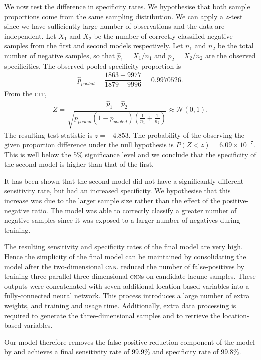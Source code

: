 We now test the difference in specificity rates. We hypothesise that both sample proportions come from the same sampling distribution. We can apply a $z$-test since we have sufficiently large number of observations and the data are independent. Let $X_1$ and $X_2$ be the number of correctly classified negative samples from the first and second models respectively. Let $n_1$ and $n_2$ be the total number of negative samples, so that $\hat{p}_1 = {X_1}/{n_1}$ and $\hat{p}_2 = {X_2}/{n_2}$ are the observed specificities. The observed pooled specificity proportion is
\begin{align*}
	\hat p_{pooled} = \dfrac{1863+9977}{1879+9996} = 0.9970526.
\end{align*}
From the \textsc{clt},
\begin{align*}
	Z = \dfrac{\hat{p}_1 - \hat{p}_2}{\sqrt{p_{pooled}(1 - p_{pooled})\left(\frac{1}{n_1} + \frac{1}{n_2}\right)}} \approx \mathcal{N}(0,1).
\end{align*}
The resulting test statistic is $z = -4.853$. The probability of the observing the given proportion difference under the null hypothesis is $P(Z < z) = 6.09\times10^{-7}$. This is well below the 5\% significance level and we conclude that the specificity of the second model is higher than that of the first.

It has been shown that the second model did not have a significantly different sensitivity rate, but had an increased specificity. We hypothesise that this increase was due to the larger sample size rather than the effect of the positive-negative ratio. The model was able to correctly classify a greater number of negative samples since it was exposed to a larger number of negatives during training.

The resulting sensitivity and specificity rates of the final model are very high. Hence the simplicity of the final model can be maintained by consolidating the model after the two-dimensional \textsc{cnn}. \cite{GhafoorianM.2017Dml3} reduced the number of false-positives by training three parallel three-dimensional \textsc{cnn}s on candidate lacune samples. These outputs were concatenated with seven additional location-based variables into a fully-connected neural network. This process introduces a large number of extra weights, and training and usage time. Additionally, extra data processing is required to generate the three-dimensional samples and to retrieve the location-based variables.

Our model therefore removes the false-positive reduction component of the model by \cite{GhafoorianM.2017Dml3} and achieves a final sensitivity rate of 99.9\% and specificity rate of 99.8\%.

